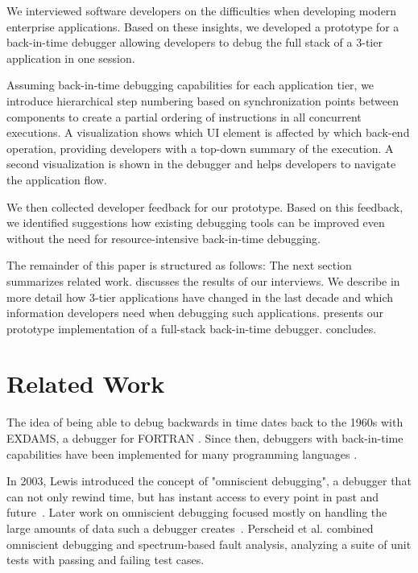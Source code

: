 \documentclass[
      english,
			conference,
      ]{IEEEtran}
\begin{document}
We interviewed software developers on the difficulties when developing modern enterprise applications.
Based on these insights, we developed a prototype for a back-in-time debugger allowing developers to debug the full stack of a 3-tier application in one session.

Assuming back-in-time debugging capabilities for each application tier, we introduce hierarchical step numbering based on synchronization points between components to create a partial ordering of instructions in all concurrent executions.
A visualization shows which UI element is affected by which back-end operation, providing developers with a top-down summary of the execution.
A second visualization is shown in the debugger and helps developers to navigate the application flow.

We then collected developer feedback for our prototype.
Based on this feedback, we identified suggestions how existing debugging tools can be improved even without the need for resource-intensive back-in-time debugging.

The remainder of this paper is structured as follows:
The next section summarizes related work.
 discusses the results of our interviews. 
We describe in more detail how 3-tier applications have changed in the last decade and which information developers need when debugging such applications.
 presents our prototype implementation of a full-stack back-in-time debugger.
 concludes.

\section{Related Work}


The idea of being able to debug backwards in time dates back to the 1960s with EXDAMS, a debugger for FORTRAN \cite{balzer_exdams_1969}.
Since then, debuggers with back-in-time capabilities have been implemented for many programming languages \cite{agrawal_debugging_1993, feldman_igor_1988, lieberman_zstep_1997}.

In 2003, Lewis introduced the concept of "omniscient debugging", a debugger that can not only rewind time, but has instant access to every point in past and future~\cite{lewis_debugging_2003}.
Later work on omniscient debugging focused mostly on handling the large amounts of data such a debugger creates~\cite{pothier_scalable_2007, lienhard_practical_2008}.
Perscheid et al. \cite{perscheid_testdriven_2013} combined omniscient debugging and spectrum-based fault analysis, analyzing a suite of unit tests with passing and failing test cases.
\end{document}
